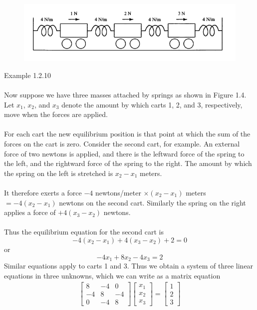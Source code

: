\documentclass{article}
\begin{document}
	\begin{figure}
		\centering
		\includegraphics{1020010}
		\caption{}		
		\label{fig:1.4}
	\end{figure}
	Example 1.2.10\\
	\\
	Now suppose we have three masses attached by springs as shown 
	in Figure 1.4. Let $x_1$, $x_2$, and $x_3$ denote the amount by which carts 1, 2, and 3, 
	respectively, move when the forces are applied.\\
	\\
	For each cart the new equilibrium position is that point at which the sum of the forces on the cart is zero. Consider the second cart, for example. An external force of two newtons is applied, and there is 
the leftward force of the spring to the left, and the rightward force of the spring to the right. The amount by which the spring on the left is stretched is $x_2 - x_1$ meters.\\
	\\ 
	It therefore exerts a force $-4$ newtons/meter $\times (x_2 - x_1)$ meters $= -4(x_2 - x_1)$ newtons on the second cart. Similarly the spring on the right applies a force of $+4(x_3 - x_2)$ newtons.\\
	\\
	Thus the equilibrium equation for the second cart is 
	$$-4(x_2-x_1)+4(x_3-x_2)+2=0$$
	or
	$$-4x_1+8x_2-4x_3=2$$
	Similar equations apply to carts 1 and 3. Thus we obtain a system of three linear equations in three unknowns, which we can write as a matrix equation
	\begin{align*}
	\begin{bmatrix}8&-4&0\\-4&8&-4\\0&-4&8\end{bmatrix} \begin{bmatrix} x_1\\x_2\\x_3 \end{bmatrix} = 
	\begin{bmatrix}1\\2\\3\end{bmatrix}
	\end{align*}	
\end{document}
